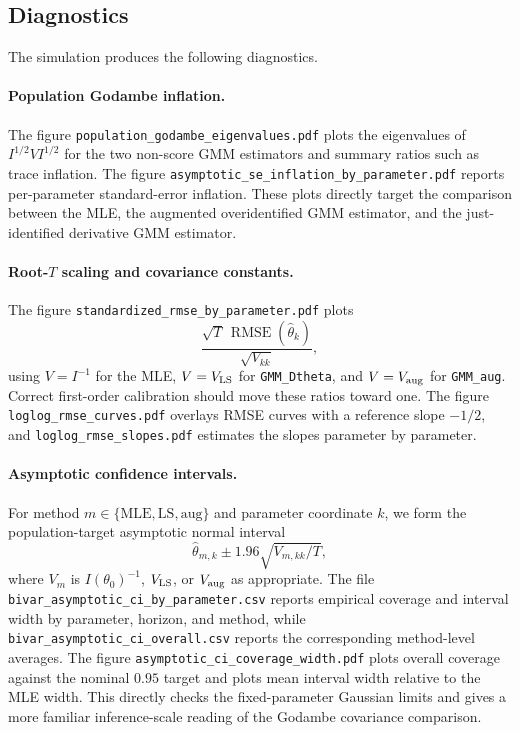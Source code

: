 \subsection{Diagnostics}

The simulation produces the following diagnostics.

\paragraph{Population Godambe inflation.}
The figure \texttt{population\_godambe\_eigenvalues.pdf} plots the eigenvalues of $I^{1/2}VI^{1/2}$ for the two non-score GMM estimators and summary ratios such as trace inflation.  The figure \texttt{asymptotic\_se\_inflation\_by\_parameter.pdf} reports per-parameter standard-error inflation.  These plots directly target the comparison between the MLE, the augmented overidentified GMM estimator, and the just-identified derivative GMM estimator.

\paragraph{Root-$T$ scaling and covariance constants.}
The figure \texttt{standardized\_rmse\_by\_parameter.pdf} plots
\[
    \frac{\sqrt{T}\,\operatorname{RMSE}(\hat\theta_k)}{\sqrt{V_{kk}}},
\]
using $V=I^{-1}$ for the MLE, $V=V_{\rm LS}$ for \texttt{GMM\_Dtheta}, and $V=V_{\rm aug}$ for \texttt{GMM\_aug}.  Correct first-order calibration should move these ratios toward one.  The figure \texttt{loglog\_rmse\_curves.pdf} overlays RMSE curves with a reference slope $-1/2$, and \texttt{loglog\_rmse\_slopes.pdf} estimates the slopes parameter by parameter.


\paragraph{Asymptotic confidence intervals.}
For method $m\in\{\mathrm{MLE},\mathrm{LS},\mathrm{aug}\}$ and parameter coordinate $k$, we form the population-target asymptotic normal interval
\[
    \hat\theta_{m,k}\pm 1.96\sqrt{V_{m,kk}/T},
\]
where $V_m$ is $I(\theta_0)^{-1}$, $V_{\rm LS}$, or $V_{\rm aug}$ as appropriate.  The file \texttt{bivar\_asymptotic\_ci\_by\_parameter.csv} reports empirical coverage and interval width by parameter, horizon, and method, while \texttt{bivar\_asymptotic\_ci\_overall.csv} reports the corresponding method-level averages.  The figure \texttt{asymptotic\_ci\_coverage\_width.pdf} plots overall coverage against the nominal $0.95$ target and plots mean interval width relative to the MLE width.  This directly checks the fixed-parameter Gaussian limits and gives a more familiar inference-scale reading of the Godambe covariance comparison.

